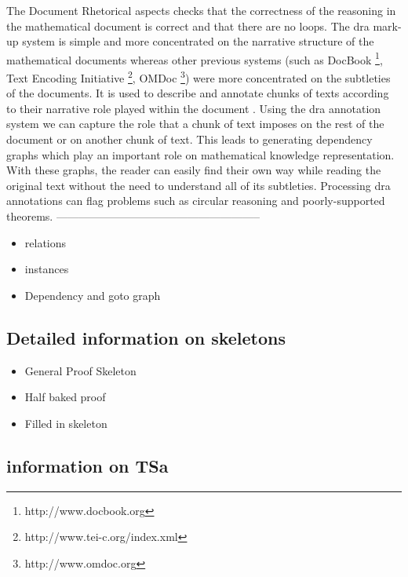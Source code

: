The Document Rhetorical aspects checks that the correctness of the reasoning in the mathematical document is correct and that there are no loops. The \gls{dra} mark-up system is simple and more concentrated on the narrative structure of the mathematical documents whereas other previous systems (such as DocBook \footnote{http://www.docbook.org}, Text Encoding Initiative \footnote{http://www.tei-c.org/index.xml}, OMDoc \footnote{http://www.omdoc.org}) were more concentrated on  the subtleties of the documents. It is used to describe and annotate chunks of texts according to their narrative role played within the document \cite{krzysztofphd}. Using the \gls{dra} annotation system we can capture the role that a chunk of text imposes on the rest of the document or on another chunk of text. This leads to generating dependency graphs which play an important role on mathematical knowledge representation. With these graphs, the reader can easily find their own way while reading the original text without the need to understand all of its subtleties. Processing \gls{dra} annotations can flag problems such as circular reasoning and poorly-supported theorems.
--------------------------------------------------------

\begin{itemize}
\item relations

\item instances

\item Dependency and goto graph
\end{itemize}

\subsection{Detailed information on skeletons}

\begin{itemize}
\item General Proof Skeleton

\item Half baked proof

\item Filled in skeleton
\end{itemize}

\subsection{information on TSa}
\label{subsec:tsa}

